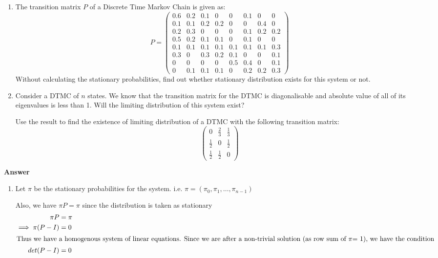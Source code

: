 \documentclass[12pt, oneside]{article}
\begin{document}
\begin{enumerate}
{    \begin{enumerate}
        \item {
            The transition matrix \(P\) of a Discrete Time Markov Chain is given as:
            \[P = \begin{pmatrix}
                0.6 & 0.2 & 0.1 & 0 & 0 & 0.1 & 0 & 0 \\
                0.1	& 0.1 & 0.2 & 0.2 & 0 & 0 & 0.4 & 0 \\
                0.2 & 0.3 & 0 & 0 & 0 & 0.1 & 0.2 & 0.2 \\
                0.5 & 0.2 & 0.1 & 0.1 & 0 & 0.1 & 0 & 0 \\
                0.1 & 0.1 & 0.1 & 0.1 & 0.1 & 0.1 & 0.1 & 0.3 \\
                0.3 & 0 & 0.3 & 0.2 & 0.1 & 0 & 0 & 0.1 \\
                0 & 0 & 0 & 0 & 0.5 & 0.4 & 0 & 0.1 \\
                0 & 0.1 & 0.1 & 0.1 & 0 & 0.2 & 0.2 & 0.3
            \end{pmatrix}\]
            Without calculating the stationary probabilities, find out whether stationary
            distribution exists for this system or not.
        }
        \item {
            Consider a DTMC of \(n\) states. We know that the transition matrix for the
            DTMC is diagonalisable and absolute value of all of its eigenvalues is less than 1.
            Will the limiting distribution of this system exist?

            Use the result to find the existence of limiting distribution of a DTMC with
            the following transition matrix:
            \[\begin{pmatrix}
                0 & \frac{2}{3} & \frac{1}{3} \\
                \frac{1}{2} & 0 & \frac{1}{2} \\
                \frac{1}{2} & \frac{1}{2} & 0
            \end{pmatrix}\]
        }
    \end{enumerate}

    \textbf{Answer}

    \begin{enumerate}
        \item {
            Let \(\pi\) be the stationary probabilities for the system. i.e.
            \(\pi = (\pi_0, \pi_1, \ldots, \pi_{n-1})\)

            Also, we have \(\pi P = \pi\) since the distribution is taken as stationary
            \begin{align*}
                \pi P &= \pi \\
                \implies \pi (P - I) &= 0 \\
                \intertext{Thus we have a homogenous system of linear equations. Since we are
                after a non-trivial solution (as row sum of \(\pi\)= 1), we have the condition}
                det(P - I) &= 0
            \end{align*}

}
\end{enumerate}}
\end{enumerate}
\end{document}
